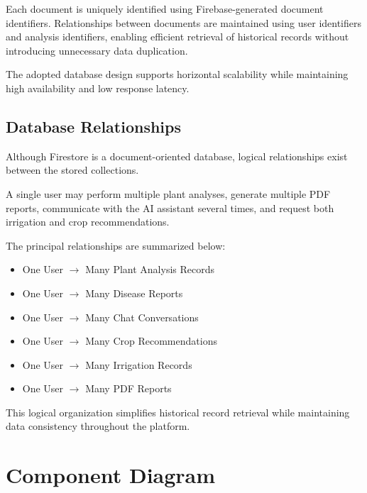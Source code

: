 Each document is uniquely identified using Firebase-generated document identifiers. Relationships between documents are maintained using user identifiers and analysis identifiers, enabling efficient retrieval of historical records without introducing unnecessary data duplication.

The adopted database design supports horizontal scalability while maintaining high availability and low response latency.

\subsection{Database Relationships}

Although Firestore is a document-oriented database, logical relationships exist between the stored collections.

A single user may perform multiple plant analyses, generate multiple PDF reports, communicate with the AI assistant several times, and request both irrigation and crop recommendations.

The principal relationships are summarized below:

\begin{itemize}

\item One User $\rightarrow$ Many Plant Analysis Records

\item One User $\rightarrow$ Many Disease Reports

\item One User $\rightarrow$ Many Chat Conversations

\item One User $\rightarrow$ Many Crop Recommendations

\item One User $\rightarrow$ Many Irrigation Records

\item One User $\rightarrow$ Many PDF Reports

\end{itemize}

This logical organization simplifies historical record retrieval while maintaining data consistency throughout the platform.

\section{Component Diagram}
\label{sec:component_diagram}

